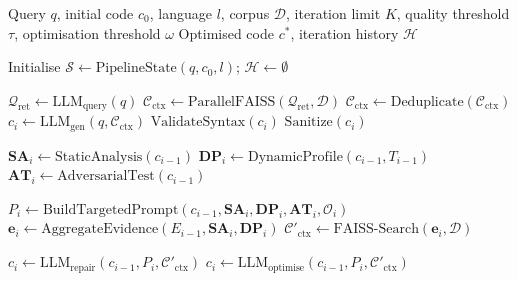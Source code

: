 \begin{algorithm}[htbp]
\caption{Stage-2: Execution-Grounded Retrieval Refinement (EGRR)}
\label{alg:egrr}
\begin{algorithmic}[1]

\REQUIRE Query $q$, initial code $c_0$, language $l$, corpus $\mathcal{D}$, iteration limit $K$, quality threshold $\tau$, optimisation threshold $\omega$
\ENSURE Optimised code $c^{*}$, iteration history $\mathcal{H}$

\STATE Initialise $\mathcal{S} \leftarrow \text{PipelineState}(q, c_0, l)$; \quad $\mathcal{H} \leftarrow \emptyset$


        \STATE {}
        \STATE $\mathcal{Q}_{\text{ret}} \leftarrow \text{LLM}_{\text{query}}(q)$
        \STATE $\mathcal{C}_{\text{ctx}} \leftarrow \text{ParallelFAISS}(\mathcal{Q}_{\text{ret}}, \mathcal{D})$
        \STATE $\mathcal{C}_{\text{ctx}} \leftarrow \text{Deduplicate}(\mathcal{C}_{\text{ctx}})$
        \STATE $c_i \leftarrow \text{LLM}_{\text{gen}}(q, \mathcal{C}_{\text{ctx}})$
        \STATE $\text{ValidateSyntax}(c_i)$
        \STATE $\text{Sanitize}(c_i)$

    \ELSE
        \STATE {}
        \STATE $\mathbf{SA}_i \leftarrow \text{StaticAnalysis}(c_{i-1})$
        \STATE $\mathbf{DP}_i \leftarrow \text{DynamicProfile}(c_{i-1}, T_{i-1})$
        \STATE $\mathbf{AT}_i \leftarrow \text{AdversarialTest}(c_{i-1})$

        \STATE $P_i \leftarrow \text{BuildTargetedPrompt}(c_{i-1}, \mathbf{SA}_i, \mathbf{DP}_i, \mathbf{AT}_i, \mathcal{O}_i)$
        \STATE $\mathbf{e}_i \leftarrow \text{AggregateEvidence}(E_{i-1}, \mathbf{SA}_i, \mathbf{DP}_i)$
        \STATE $\mathcal{C}'_{\text{ctx}} \leftarrow \text{FAISS-Search}(\mathbf{e}_i, \mathcal{D})$

            \STATE $c_i \leftarrow \text{LLM}_{\text{repair}}(c_{i-1}, P_i, \mathcal{C}'_{\text{ctx}})$
        \ELSE
            \STATE $c_i \leftarrow \text{LLM}_{\text{optimise}}(c_{i-1}, P_i, \mathcal{C}'_{\text{ctx}})$
        \ENDIF


\end{algorithmic}
\end{algorithm}
